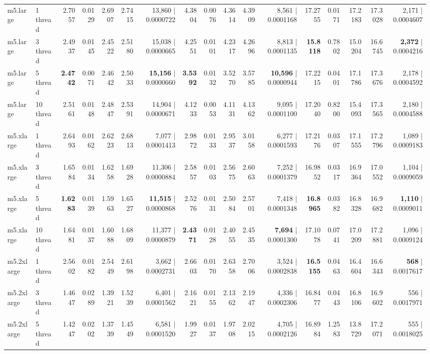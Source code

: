 \documentclass[conference]{IEEEtran}
\begin{document}
\begin{table}[h]
{\begin{tabular}{ll|rrrrr|rrrrr|rrrrr}
				\midrule
			m5.large & 1 thread & 2.7057 & 0.0129 & 2.6907 & 2.7415 & 13,860 | 0.0000722 & 4.3804 & 0.0076 & 4.3614 & 4.3909 & 8,561 | 0.0001168 & 17.2755 & 0.0171 & 17.2183 & 17.3028 & 2,171 | 0.0004607 \\
			m5.large & 3 thread & 2.4937 & 0.0145 & 2.4522 & 2.5180 & 15,038 | 0.0000665 & 4.2551 & 0.0101 & 4.2317 & 4.2696 & 8,813 | 0.0001135 & \textbf{15.8118} & 0.7802 & 15.0204 & 16.6745 & \textbf{2,372} | 0.0004216 \\
			m5.large & 5 thread & \textbf{2.4742} & 0.0071 & 2.4642 & 2.5033 & \textbf{15,156} | 0.0000660 & \textbf{3.5392} & 0.0132 & 3.5270 & 3.5785 & \textbf{10,596} | 0.0000944 & 17.2215 & 0.0401 & 17.1786 & 17.3676 & 2,178 | 0.0004592 \\
			m5.large & 10 thread & 2.5161 & 0.0148 & 2.4847 & 2.5391 & 14,904 | 0.0000671 & 4.1233 & 0.0053 & 4.1131 & 4.1362 & 9,095 | 0.0001100 & 17.2040 & 0.8200 & 15.4093 & 17.3565 & 2,180 | 0.0004588 \\
			\midrule
			m5.xlarge & 1 thread & 2.6493 & 0.0162 & 2.6223 & 2.6813 & 7,077 | 0.0001413 & 2.9872 & 0.0133 & 2.9537 & 3.0158 & 6,277 | 0.0001593 & 17.2176 & 0.0307 & 17.1555 & 17.2796 & 1,089 | 0.0009183 \\
			m5.xlarge & 3 thread & 1.6584 & 0.0134 & 1.6258 & 1.6928 & 11,306 | 0.0000884 & 2.5857 & 0.0103 & 2.5675 & 2.6063 & 7,252 | 0.0001379 & 16.9852 & 0.0317 & 16.9364 & 17.0552 & 1,104 | 0.0009059 \\
			m5.xlarge & 5 thread & \textbf{1.6283} & 0.0139 & 1.5963 & 1.6527 & \textbf{11,515} | 0.0000868 & 2.5276 & 0.0131 & 2.5084 & 2.5701 & 7,418 | 0.0001348 & \textbf{16.8965} & 0.0382 & 16.8328 & 16.9682 & \textbf{1,110} | 0.0009011 \\
			m5.xlarge & 10 thread & 1.6481 & 0.0137 & 1.6088 & 1.6809 & 11,377 | 0.0000879 & \textbf{2.4371} & 0.0128 & 2.4055 & 2.4535 & \textbf{7,694} | 0.0001300 & 17.1078 & 0.0741 & 17.0209 & 17.2881 & 1,096 | 0.0009124 \\
			\midrule
			m5.2xlarge & 1 thread & 2.5602 & 0.0182 & 2.5449 & 2.6198 & 3,662 | 0.0002731 & 2.6603 & 0.0170 & 2.6358 & 2.7006 & 3,524 | 0.0002838 & \textbf{16.5155} & 0.0463 & 16.4604 & 16.6343 & \textbf{568} | 0.0017617 \\
			m5.2xlarge & 3 thread & 1.4647 & 0.0289 & 1.3921 & 1.5239 & 6,401 | 0.0001562 & 2.1621 & 0.0155 & 2.1362 & 2.1947 & 4,336 | 0.0002306 & 16.8477 & 0.0443 & 16.8106 & 16.9602 & 556 | 0.0017971 \\
			m5.2xlarge & 5 thread & 1.4247 & 0.0202 & 1.3739 & 1.4549 & 6,581 | 0.0001520 & 1.9927 & 0.0137 & 1.9708 & 2.0215 & 4,705 | 0.0002126 & 16.8984 & 1.2583 & 13.8729 & 17.2071 & 555 | 0.0018025 \\

\end{tabular}}
\end{table}
\end{document}

